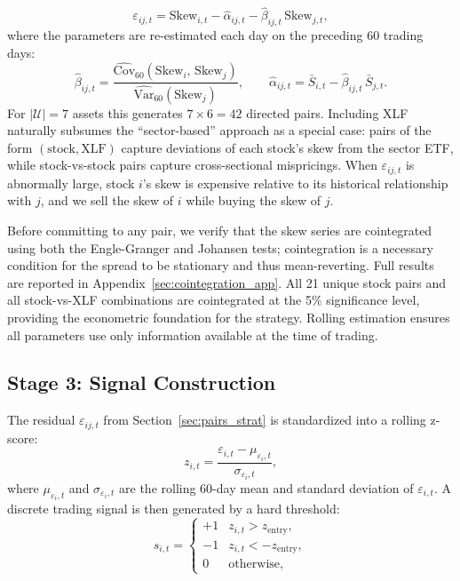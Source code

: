\documentclass[12pt, a4paper]{article}
\begin{document}
\begin{equation}
    \varepsilon_{ij,t}
    = \mathrm{Skew}_{i,t} - \hat{\alpha}_{ij,t}
      - \hat{\beta}_{ij,t}\,\mathrm{Skew}_{j,t},
    \label{eq:pair_spread}
\end{equation}
where the parameters are re-estimated each day on the preceding 60 trading days:
\[
    \hat{\beta}_{ij,t}
    = \frac{\widehat{\mathrm{Cov}}_{60}(\mathrm{Skew}_i,\,\mathrm{Skew}_j)}
           {\widehat{\mathrm{Var}}_{60}(\mathrm{Skew}_j)},
    \qquad
    \hat{\alpha}_{ij,t} = \bar{S}_{i,t} - \hat{\beta}_{ij,t}\,\bar{S}_{j,t}.
\]
For $|\mathcal{U}|=7$ assets this generates $7\times 6=42$ directed pairs. Including XLF naturally subsumes the ``sector-based'' approach as a special case: pairs of the form $(\text{stock}, \text{XLF})$ capture deviations of each stock's skew from the sector ETF, while stock-vs-stock pairs capture cross-sectional mispricings. When $\varepsilon_{ij,t}$ is abnormally large, stock $i$'s skew is expensive relative to its historical relationship with $j$, and we sell the skew of $i$ while buying the skew of $j$.

Before committing to any pair, we verify that the skew series are cointegrated using both the Engle-Granger and Johansen tests; cointegration is a necessary condition for the spread to be stationary and thus mean-reverting. Full results are reported in Appendix~\ref{sec:cointegration_app}. All 21 unique stock pairs and all stock-vs-XLF combinations are cointegrated at the 5\% significance level, providing the econometric foundation for the strategy. Rolling estimation ensures all parameters use only information available at the time of trading.

\subsection{Stage 3: Signal Construction}
\label{sec:signal}

The residual $\varepsilon_{ij,t}$ from Section~\ref{sec:pairs_strat} is standardized into a rolling z-score:
\begin{equation}
    z_{i,t}
    = \frac{\varepsilon_{i,t} - \mu_{\varepsilon_i,t}}{\sigma_{\varepsilon_i,t}},
    \label{eq:zscore}
\end{equation}
where $\mu_{\varepsilon_i,t}$ and $\sigma_{\varepsilon_i,t}$ are the rolling 60-day mean and standard deviation of $\varepsilon_{i,t}$. A discrete trading signal is then generated by a hard threshold:
\begin{equation}
    s_{i,t} =
    \begin{cases}
        +1  & z_{i,t} > z_{\mathrm{entry}}, \\
        -1  & z_{i,t} < -z_{\mathrm{entry}}, \\
        0   & \text{otherwise},
    \end{cases}
    \label{eq:signal_threshold}
\end{equation}
\end{document}

